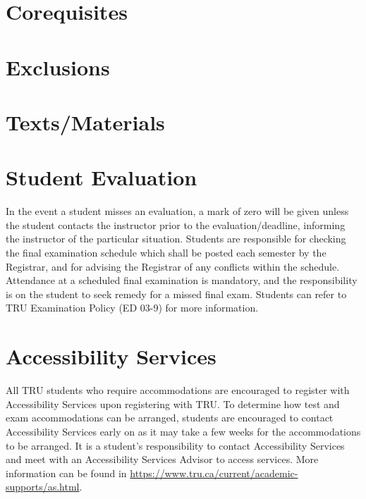 \documentclass[10pt]{trumathoutline}
\begin{document}
\section*{Corequisites}
\coursecorequisites

\section*{Exclusions}
\courseexclusions

\section*{Texts/Materials}
\textsmaterials

\section*{Student Evaluation}
\evaluation

In the event a student misses an evaluation, a mark of zero will be given unless the student contacts the instructor prior to the evaluation/deadline, informing the instructor of the particular situation. Students are responsible for checking the final examination schedule which shall be posted each semester by the Registrar, and for advising the Registrar of any conflicts within the schedule. Attendance at a scheduled final examination is mandatory, and the responsibility is on the student to seek remedy for a missed final exam. Students can refer to TRU Examination Policy (ED 03-9) for more information.


\section*{Accessibility Services}
All TRU students who require accommodations are encouraged to register with Accessibility Services upon registering with TRU. To determine how test and exam accommodations can be arranged, students are encouraged to contact Accessibility Services early on as it may take a few weeks for the accommodations to be arranged. It is a student's responsibility to contact Accessibility Services and meet with an Accessibility Services Advisor to access services. More information can be found in
\href{https://www.tru.ca/current/academic-supports/as.html}{https://www.tru.ca/current/academic-supports/as.html}.
\end{document}

